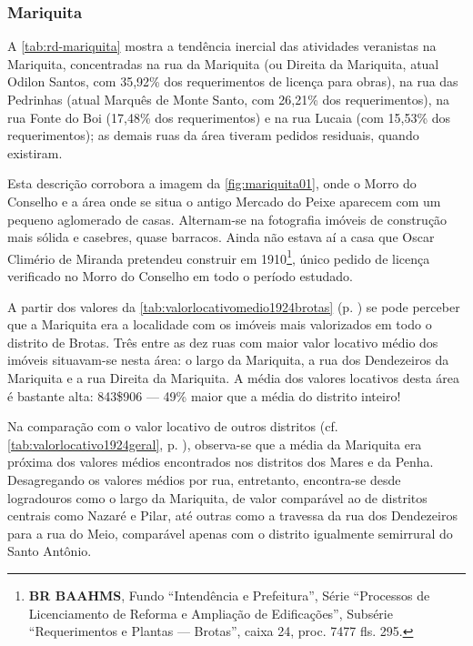 \subsubsection{Mariquita}


A \autoref{tab:rd-mariquita} mostra a tendência inercial das atividades veranistas na Mariquita, concentradas na rua da Mariquita (ou Direita da Mariquita, atual Odilon Santos, com 35,92\% dos requerimentos de licença para obras), na rua das Pedrinhas (atual Marquês de Monte Santo, com 26,21\% dos requerimentos), na rua Fonte do Boi (17,48\% dos requerimentos) e na rua Lucaia (com 15,53\% dos requerimentos); as demais ruas da área tiveram pedidos residuais, quando existiram.





Esta descrição corrobora a imagem da \autoref{fig:mariquita01}, onde o Morro do Conselho e a área onde se situa o antigo Mercado do Peixe aparecem com um pequeno aglomerado de casas. Alternam-se na fotografia imóveis de construção mais sólida e casebres, quase barracos. Ainda não estava aí a casa que Oscar Climério de Miranda pretendeu construir em 1910\footnote{\textbf{BR BAAHMS}, Fundo ``Intendência e Prefeitura'', Série ``Processos de Licenciamento de Reforma e Ampliação de Edificações'', Subsérie ``Requerimentos e Plantas --- Brotas'', caixa 24, proc. 7477 fls. 295.}, único pedido de licença verificado no Morro do Conselho em todo o período estudado.


A partir dos valores da \autoref{tab:valorlocativomedio1924brotas} (p. \pageref{tab:valorlocativomedio1924brotas}) se pode perceber que a Mariquita era a localidade com os imóveis mais valorizados em todo o distrito de Brotas. Três entre as dez ruas com maior valor locativo médio dos imóveis situavam-se nesta área: o largo da Mariquita, a rua dos Dendezeiros da Mariquita e a rua Direita da Mariquita. A média dos valores locativos desta área é bastante alta: 843\$906 --- 49\% maior que a média do distrito inteiro! 

Na comparação com o valor locativo de outros distritos (cf. \autoref{tab:valorlocativo1924geral}, p. \pageref{tab:valorlocativo1924geral}), observa-se que a média da Mariquita era próxima dos valores médios encontrados nos distritos dos Mares e da Penha. Desagregando os valores médios por rua, entretanto, encontra-se desde logradouros como o largo da Mariquita, de valor comparável ao de distritos centrais como Nazaré e Pilar, até outras como a travessa da rua dos Dendezeiros para a rua do Meio, comparável apenas com o distrito igualmente semirrural do Santo Antônio.

